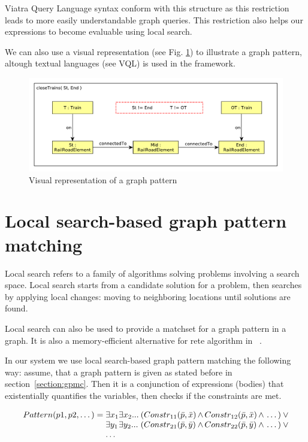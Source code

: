 Viatra Query Language syntax conform with this structure as this restriction leads to more easily understandable graph queries.
This restriction also helps our expressions to become evaluable using local search.

We can also use a visual representation (see Fig. \ref{fig:pattern-visual}) to illustrate a graph pattern, altough textual languages (see VQL) is used in the framework.

\begin{figure}[h]
	\begin{center}
		\includegraphics[width=\textwidth]{figures/closeTrains-pattern.pdf}
		\caption{Visual representation of a graph pattern}
		\label{fig:pattern-visual}
	\end{center}
\end{figure}


\section{Local search-based graph pattern matching}


Local search refers to a family of algorithms solving problems involving a search space. 
Local search starts from a candidate solution for a problem, then searches by applying local changes: moving to neighboring locations until solutions are found.

Local search can also be used to provide a matchset for a graph pattern in a graph.
It is also a memory-efficient alternative for rete algorithm in \viatra{}~\cite{bur-marton-msc}.

In our system we use local search-based graph pattern matching the following way:
assume, that a graph pattern is given as stated before in section~\ref{section:gpmc}.
Then it is a conjunction of expressions (bodies) that existentially quantifies the variables, then checks if the constraints are met.


\begin{equation}
\begin{array}{@{}r@{}l@{}l@{}l@{}l@{}l@{}}
Pattern(p1, p2, \dots) = \;
& \exists{x_1} & \exists{x_2}... \: & 
(Constr_{11}(\bar{p},\bar{x} ) & \, \wedge \, Constr_{12}(\bar{p},\bar{x} ) & \, \wedge \, \dots{}) \: \vee \\

& \exists{y_1} & \exists{y_2}... \: & 
(Constr_{21}(\bar{p},\bar{y} ) & \, \wedge \, Constr_{22}(\bar{p},\bar{y} ) & \, \wedge \, \dots{}) \: \vee \\
& \dots{}
\end{array}
\end{equation}

